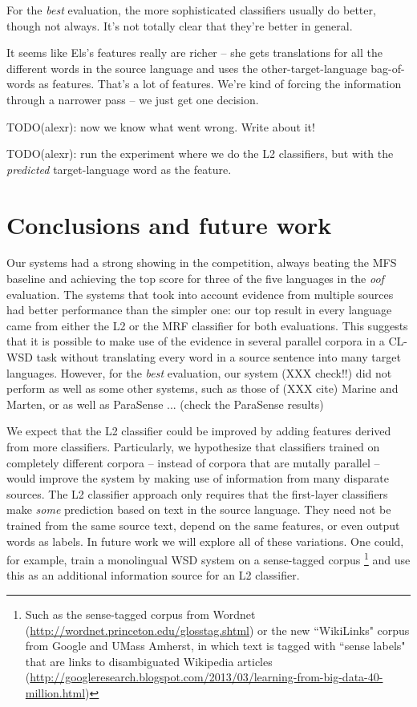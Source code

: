 \documentclass[11pt,letterpaper]{article}
\begin{document}
For the \emph{best} evaluation, the more sophisticated classifiers usually do
better, though not always. It's not totally clear that they're better in
general.

It seems like Els's features really are richer -- she gets translations for all
the different words in the source language and uses the other-target-language
bag-of-words as features. That's a lot of features. We're kind of forcing the
information through a narrower pass -- we just get one decision.

TODO(alexr): now we know what went wrong. Write about it!

TODO(alexr): run the experiment where we do the L2 classifiers, but with the
\emph{predicted} target-language word as the feature.

\section{Conclusions and future work}
Our systems had a strong showing in the competition, always beating the MFS
baseline and achieving the top score for three of the five languages in the
\emph{oof} evaluation. The systems that took into account evidence from
multiple sources had better performance than the simpler one: our top result in
every language came from either the L2 or the MRF classifier for
both evaluations. This suggests that it is possible to make use of the evidence
in several parallel corpora in a CL-WSD task without translating every word in
a source sentence into many target languages. However, for the \emph{best}
evaluation, our system (XXX check!!) did not perform as well as some other
systems, such as those of (XXX cite) Marine and Marten, or as well as ParaSense
... (check the ParaSense results)


We expect that the L2 classifier could be improved by adding features
derived
from more classifiers. Particularly, we hypothesize that classifiers trained on
completely different corpora -- instead of corpora that are mutally parallel --
would improve the system by making use of information from many disparate
sources. The L2 classifier approach only requires that the first-layer
classifiers make \emph{some} prediction based on text in the source language.
They need not be trained from the same source text, depend on the same
features, or even output words as labels. In future work we will explore
all of these variations. One could, for example, train a monolingual WSD system
on a sense-tagged corpus \footnote{Such as the sense-tagged corpus from Wordnet
(\url{http://wordnet.princeton.edu/glosstag.shtml})
or the new ``WikiLinks" corpus from Google and UMass Amherst, in which text is
tagged with ``sense labels" that are links to disambiguated Wikipedia
articles
(\url{http://googleresearch.blogspot.com/2013/03/learning-from-big-data-40-million.html})}
and use this as an additional information source for an L2 classifier.
\end{document}
